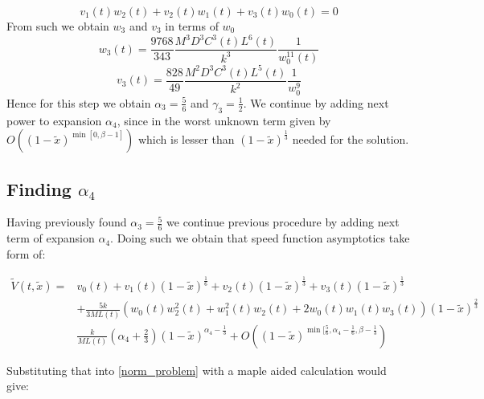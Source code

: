 \begin{equation}
v_{1}(t)w_{2}(t)+v_{2}(t)w_{1}(t)+v_{3}(t)w_{0}(t)=0\label{relation_3}
\end{equation}
From such we obtain $w_3$ and $v_3$ in terms of $w_0$
\begin{equation}
w_{3}(t)=\frac{9768}{343}\frac{M^3D^3C^3(t)L^6(t)}{k^3}\frac{1}{w_{0}^{11}(t)}\label{w_3}
\end{equation}
\begin{equation}
v_{3}(t)=\frac{828}{49}\frac{M^{2}D^{3}C^{3}(t)L^{5}(t)}{k^{2}}\frac{1}{w_{0}^{9}}\label{v_3}
\end{equation}
Hence for this step we obtain $\alpha_{3}=\frac{5}{6}$ and $\gamma_{3}=\frac{1}{2}$. We continue by adding next power to expansion $\alpha_{4}$, since in the worst unknown term given by $O\left((1-\tilde{x})^{\min{[0,\beta-1]}}\right)$ which is lesser than $(1-\tilde{x})^{\frac{1}{3}}$ needed for the solution.

\subsection{Finding $\alpha_{4}$}

Having previously found $\alpha_{3}=\frac{5}{6}$ we continue previous procedure by adding next term of expansion $\alpha_{4}$. Doing such we obtain that speed function asymptotics take form of:



\begin{equation}
\begin{split}
\tilde{V}(t,\tilde{x})=&v_0(t)+v_1(t)(1- \tilde x)^{\frac{1}{6}}+v_2(t)(1- \tilde x)^{\frac{1}{3}}+v_3(t)(1- \tilde x)^{\frac{1}{3}}\\
&+\frac{5k}{3ML(t)}\left(w_0(t)w_2^2(t)+w_1^2(t)w_2(t)+2w_0(t)w_1(t)w_3(t)\right)(1- \tilde x)^{\frac{2}{3}}\\
&\frac{k}{ML(t)}\left(\alpha_4 +\frac{2}{3}\right)(1- \tilde x)^{\alpha_4-\frac{1}{3}}+O\left((1-\tilde{x})^{\min{[\frac{5}{6},\alpha_{4}-\frac{1}{6},\beta-\frac{1}{3}}}\right)
\end{split}
\label{v_4_asymp}
\end{equation}


Substituting that into \eqref{norm_problem} with a maple aided calculation would give:

